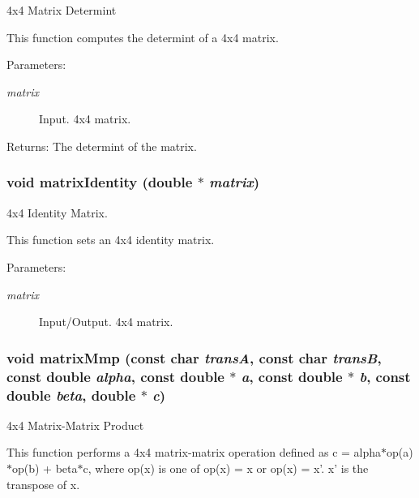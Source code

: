 4x4 Matrix Determint 

This function computes the determint of a 4x4 matrix.

\begin{Desc}
\item[Parameters:]
\begin{description}
\item[{\em matrix}]Input. 4x4 matrix.\end{description}
\end{Desc}
\begin{Desc}
\item[Returns:]The determint of the matrix. \end{Desc}
\hypertarget{group__a_g0621678b0351aa86eda18b2e559c7f71}{
\subsubsection[matrixIdentity]{\setlength{\rightskip}{0pt plus 5cm}void matrixIdentity (double $\ast$ {\em matrix})}}
\label{group__a_g0621678b0351aa86eda18b2e559c7f71}


4x4 Identity Matrix. 

This function sets an 4x4 identity matrix.

\begin{Desc}
\item[Parameters:]
\begin{description}
\item[{\em matrix}]Input/Output. 4x4 matrix. \end{description}
\end{Desc}
\hypertarget{group__a_g83ebfef715d1b7634526d23bed49d68c}{
\subsubsection[matrixMmp]{\setlength{\rightskip}{0pt plus 5cm}void matrixMmp (const char {\em transA}, \/  const char {\em transB}, \/  const double {\em alpha}, \/  const double $\ast$ {\em a}, \/  const double $\ast$ {\em b}, \/  const double {\em beta}, \/  double $\ast$ {\em c})}}
\label{group__a_g83ebfef715d1b7634526d23bed49d68c}


4x4 Matrix-Matrix Product 

This function performs a 4x4 matrix-matrix operation defined as c = alpha$\ast$op(a)$\ast$op(b) + beta$\ast$c, where op(x) is one of op(x) = x or op(x) = x'. x' is the transpose of x.

